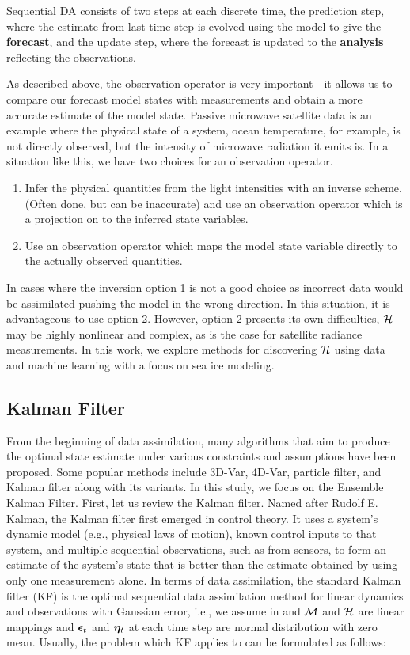 Sequential DA consists of two steps at each discrete time, the prediction step, where the estimate from last time step is evolved using the model to give the \textbf{forecast}, and the update step, where the forecast is updated to the \textbf{analysis} reflecting the observations.\par

As described above, the observation operator is very important - it allows us to compare our forecast model states with measurements and obtain a more accurate estimate of the model state. Passive microwave satellite data is an example where the physical state of a system, ocean temperature, for example, is not directly observed, but the intensity of microwave radiation it emits is. In a situation like this, we have two choices for an observation operator. 
\begin{enumerate}
    \item Infer the physical quantities from the light intensities with an inverse scheme. (Often done, but can be inaccurate) and use an observation operator which is a projection on to the inferred state variables.
    \item Use an observation operator which maps the model state variable directly to the actually observed quantities.  
\end{enumerate}
In cases where the inversion option 1 is not a good choice as incorrect data would be assimilated pushing the model in the wrong direction. In this situation, it is advantageous to use option 2. However, option 2 presents its own difficulties, $\mathcal{H}$ may be highly nonlinear and complex, as is the case for satellite radiance measurements. In this work, we explore methods for discovering $\mathcal{H}$ using data and machine learning with a focus on sea ice modeling.

\subsection{Kalman Filter}\label{sec:IntroKF}
\par From the beginning of data assimilation, many algorithms that aim to produce the optimal state estimate under various constraints and assumptions have been proposed. Some popular methods include 3D-Var, 4D-Var, particle filter, and Kalman filter along with its variants. In this study, we focus on the Ensemble Kalman Filter. First, let us review the Kalman filter. Named after Rudolf E. Kalman, the Kalman filter first emerged in control theory. It uses a system's dynamic model (e.g., physical laws of motion), known control inputs to that system, and multiple sequential observations, such as from sensors, to form an estimate of the system's state that is better than the estimate obtained by using only one measurement alone. In terms of data assimilation, the standard Kalman filter (KF) is the optimal sequential data assimilation method for linear dynamics and observations with Gaussian error, i.e., we assume in  and  $\mathcal{M}$ and $\mathcal{H}$ are linear mappings and $\bm{\epsilon}_t$ and $\bm{\eta}_t$ at each time step are normal distribution with zero mean. Usually, the problem which KF applies to can be formulated as follows:

